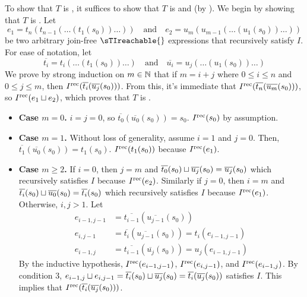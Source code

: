 \begin{elidableproof}
  \newcommand{\bart}[1]{\overline{t_{#1}}}
  \newcommand{\baru}[1]{\overline{u_{#1}}}

  To show that $T$ is \sTIconfluent{}, it suffices to show that $T$ is
  \dsTIconfluent{} and \dsTIreducible{} (by
  ). We begin by showing that
  $T$ is \dsTIconfluent{}. Let
  \[
    e_1 = t_n(t_{n-1}(\ldots (t_1(s_0))\ldots))
    \quad \text{and} \quad
    e_2 = u_m(u_{m-1}(\ldots (u_1(s_0))\ldots))
  \]
  be two arbitrary join-free $\sTIreachable{}$ expressions that recursively
  satisfy $I$. For ease of notation, let
  \[
    \bart{i} = t_i(\ldots(t_1(s_0))\ldots)
    \quad\text{and}\quad
    \baru{i} = u_j(\ldots(u_1(s_0))\ldots)
  \]
  We prove by strong induction on $m \in \mathbb{N}$ that if $m = i + j$ where $0
  \leq i \leq n$ and $0 \leq j \leq m$, then $\Irec{\bart{i}(\baru{j}(s_0))}$.
  From this, it's immediate that $\Irec{\bart{n}(\baru{m}(s_0))}$, so
  $I^{\text{rec}}(e_1 \sqcup e_2)$, which proves that $T$ is \dsTIconfluent{}.
  \begin{itemize}
    \item \textbf{Case $m = 0$.}
      $i = j = 0$, so $\bart{0}(\baru{0}(s_0)) = s_0$. $I^{\text{rec}}(s_0)$ by
      assumption.

    \item \textbf{Case $m = 1$.}
      Without loss of generality, assume $i = 1$ and $j = 0$. Then,
      $
        \bart{1}(\baru{0}(s_0))
          = t_1(s_0)
      $.
      $I^{\text{rec}}(t_1(s_0))$ because $I^{\text{rec}}(e_1)$.

    \item \textbf{Case $m \geq 2$.}
      If $i = 0$, then $j = m$ and $\bart{0}(s_0) \join \baru{j}(s_0) =
      \baru{j}(s_0)$ which recursively satisfies $I$ because $I^{\text{rec}}(e_2)$.
      Similarly if $j = 0$, then $i = m$ and $\bart{i}(s_0) \join \baru{0}(s_0)
      = \bart{i}(s_0)$ which recursively satisfies $I$ because $I^{\text{rec}}(e_1)$.
      Otherwise, $i, j > 1$. Let
      \begin{align*}
        e_{i-1,j-1}
          &= \bart{i-1}(\baru{j-1}(s_0)) \\
        e_{i,j-1}
          &= \bart{i}(\baru{j-1}(s_0))
           = t_i(e_{i-1,j-1}) \\
        e_{i-1,j}
          &= \bart{i-1}(\baru{j}(s_0))
           = u_j(e_{i-1,j-1})
      \end{align*}
      By the inductive hypothesis, $I^{\text{rec}}(e_{i-1,j-1})$, $I^{\text{rec}}(e_{i,j-1})$,
      and $I^{\text{rec}}(e_{i-1,j})$. By condition 3, $e_{i-1,j} \join e_{i,j-1} =
      \bart{i}(s_0) \join \baru{j}(s_0) = \bart{i}(\baru{j}(s_0))$ satisfies
      $I$. This implies that $\Irec{\bart{i}(\baru{j}(s_0))}$.
  \end{itemize}


\end{elidableproof}

